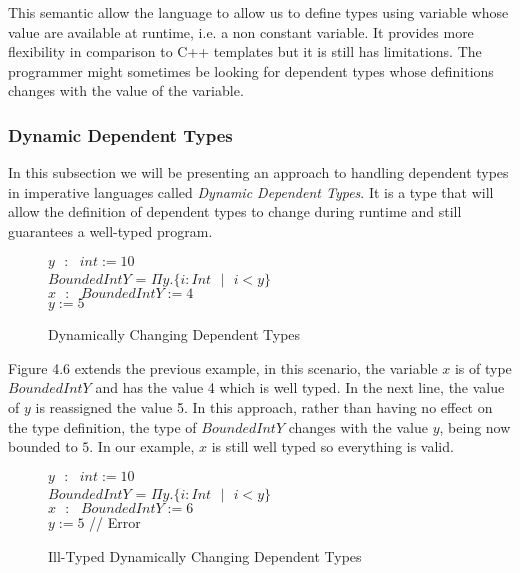\documentclass[a4paper,12pt]{report}
\begin{document}
\par
This semantic allow the language to allow us to define types using variable 
whose value are available at runtime, i.e. a non constant variable. It provides 
more flexibility in comparison to C++ templates but it is still has limitations. The 
programmer might sometimes be looking for dependent types whose definitions 
changes with the value of the variable. 

\subsubsection{Dynamic Dependent Types}
In this subsection we will be presenting an approach to handling dependent types 
in imperative languages called \textit{Dynamic Dependent Types}. It is a type 
that will allow the definition of dependent types to change during runtime and 
still guarantees a well-typed program. 


\begin{figure} [H]
  \begin{center}
    $y\text{ }:\text{ }int := 10$ \\
    $BoundedIntY$ = $\Pi y. \{i : Int\text{ }|\text{ }i < y\}$ \\ 
    $x\text{ }:\text{ }BoundedIntY := 4$ \\
    $y := 5$ \\
  \end{center}
  \caption{Dynamically Changing Dependent Types}
\end{figure}

Figure 4.6 extends the previous example, in this scenario, the variable $x$ is 
of type $BoundedIntY$ and has the value 4 which is well typed. In the next line, 
the value of $y$ is reassigned the value 5. In this approach, rather than having 
no effect on the type definition, the type of $BoundedIntY$ changes with the 
value $y$, being now bounded to $5$. In our example, $x$ is still well typed so 
everything is valid. 


\begin{figure} [H]
  \begin{center}
    $y\text{ }:\text{ }int := 10$ \\
    $BoundedIntY$ = $\Pi y. \{i : Int\text{ }|\text{ }i < y\}$ \\ 
    $x\text{ }:\text{ }BoundedIntY := 6$ \\
    $y := 5$ // Error \\
  \end{center}
  \caption{Ill-Typed Dynamically Changing Dependent Types}
\end{figure}
\end{document}
